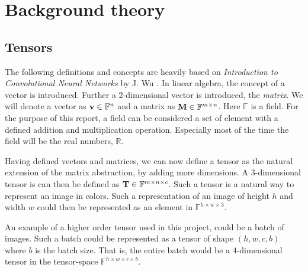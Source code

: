 \chapter{Background theory}\label{sec:background-theory}

\section{Tensors}\label{sec:tensor}
The following definitions and concepts are heavily based on \textit{Introduction to Convolutional Neural Networks} by J. Wu \cite{tensorIntroduction}.
In linear algebra, the concept of a vector is introduced.
Further a 2-dimensional vector is introduced, the \textit{matrix}.
We will denote a vector as $\textbf{v}\in \mathbb{F}^n$ and a matrix as $\textbf{M}\in \mathbb{F}^{m\times n}$.
Here $\mathbb{F}$ is a field.
For the purpose of this report, a field can be considered a set of element with a defined addition and multiplication operation.
Especially most of the time the field will be the real numbers, $\mathbb{R}$.

Having defined vectors and matrices, we can now define a tensor as the natural extension of the matrix abstraction,
by adding more dimensions.
A $3$-dimensional tensor is can then be defined as $\textbf{T}\in \mathbb{F}^{m\times n\times c}$.
Such a tensor is a natural way to represent an image in colors.
Such a representation of an image of height $h$ and width $w$ could then be represented as an
element in $\mathbb{F}^{h\times w\times 3}$.

An example of a higher order tensor used in this project, could be a batch of images.
Such a batch could be represented as a tensor of shape $(h, w, c, b)$ where $b$ is the batch size.
That is, the entire batch would be a $4$-dimensional tensor in the tensor-space $\mathbb{F}^{h\times w\times c\times b}$.

